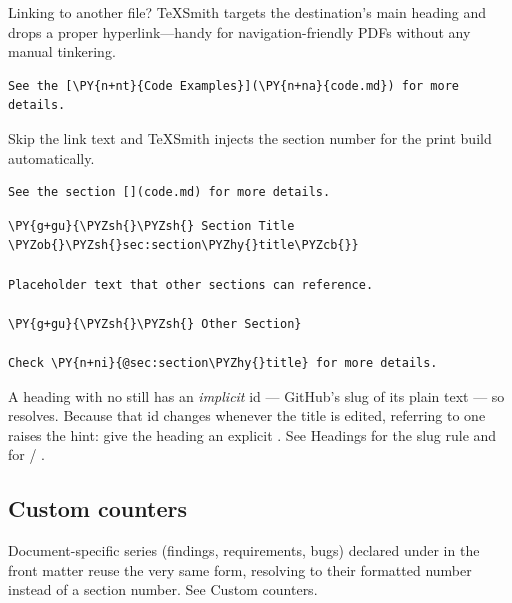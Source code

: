 \documentclass[a4paper,twoside]{article}
\begin{document}
Linking to another file? TeXSmith targets the destination's main heading and drops a proper hyperlink---handy for navigation-friendly PDFs without any manual tinkering.
\begin{tscode}[lang=md, engine=pygments]
\begin{Verbatim}[commandchars=\\\{\},breaklines, breakanywhere, commandchars=\\\{\}]
See the [\PY{n+nt}{Code Examples}](\PY{n+na}{code.md}) for more details.
\end{Verbatim}
\end{tscode}
Skip the link text and TeXSmith injects the section number for the print build automatically.
\begin{tscode}[lang=md, engine=pygments]
\begin{Verbatim}[commandchars=\\\{\},breaklines, breakanywhere, commandchars=\\\{\}]
See the section [](code.md) for more details.
\end{Verbatim}
\end{tscode}
\begin{tscode}[lang=md, engine=pygments]
\begin{Verbatim}[commandchars=\\\{\},breaklines, breakanywhere, commandchars=\\\{\}]
\PY{g+gu}{\PYZsh{}\PYZsh{} Section Title \PYZob{}\PYZsh{}sec:section\PYZhy{}title\PYZcb{}}

Placeholder text that other sections can reference.

\PY{g+gu}{\PYZsh{}\PYZsh{} Other Section}

Check \PY{n+ni}{@sec:section\PYZhy{}title} for more details.
\end{Verbatim}
\end{tscode}
A heading with no  still has an \emph{implicit} id --- GitHub's slug of its
plain text --- so  resolves. Because that id changes whenever
the title is edited, referring to one raises the  hint: give
the heading an explicit . See Headings for the slug
rule and for  / .
\subsection{Custom counters}
Document-specific series (findings, requirements, bugs) declared under
 in the front matter reuse the very same 
form, resolving to their formatted number instead of a section number. See
Custom counters.
\end{document}
